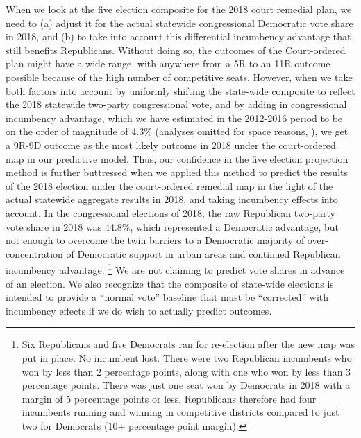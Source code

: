 \par
    When we look at the five election composite for the 2018 court remedial plan, we need to (a) adjust it for the actual statewide congressional Democratic vote share in 2018, and (b) to take into account this differential incumbency advantage that still benefits Republicans. Without doing so, the outcomes of the Court-ordered plan might have a wide range, with anywhere from a 5R to an 11R outcome possible because of the high number of competitive seats. However, when we take both factors into account by uniformly shifting the state-wide composite to reflect the 2018 statewide two-party congressional vote, and by adding in congressional incumbency advantage, which we have estimated in the 2012-2016 period to be on the order of magnitude of 4.3\% (analyses omitted for space reasons, \citet[see ][]{GelmenKing1990_inc_AJPS}), we get a 9R-9D outcome as the most likely outcome in 2018 under the court-ordered map in our predictive model. Thus, our confidence in the five election projection method is further buttressed when we applied this method to predict the results of the 2018 election under the court-ordered remedial map in the light of the actual statewide aggregate results in 2018, and taking incumbency effects into account. In the congressional elections of 2018, the raw Republican two-party vote share in 2018 was 44.8\%, which represented a Democratic advantage, but not enough to overcome the twin barriers to a Democratic majority of over-concentration of Democratic support in urban areas and continued Republican incumbency advantage.
		\footnote{Six Republicans and five Democrats ran for re-election after the new map was put in place. No incumbent lost. There were two Republican incumbents who won by less than 2 percentage points, along with one who won by less than 3 percentage points. There was just one seat won by Democrats in 2018 with a margin of 5 percentage points or less. Republicans therefore had four incumbents running and winning in competitive districts compared to just two for Democrats (10+ percentage point margin).}
    We are not claiming to predict vote shares in advance of an election. We also recognize that the composite of state-wide elections is intended to provide a ``normal vote'' baseline that must be ``corrected'' with incumbency effects if we do wish to actually predict outcomes.
